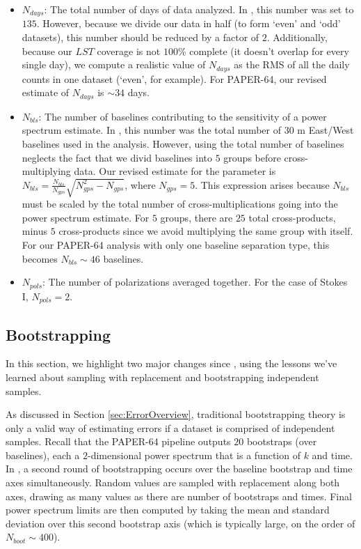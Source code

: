 \documentclass[preprint2,numberedappendix,tighten,twocolappendix]{aastex6}  %
\begin{document}
\begin{itemize}
\item $N_{days}$: The total number of days of data analyzed. In \citet{ali_et_al2015}, this number was set to $135$. However, because we divide our data in half (to form `even' and `odd' datasets), this number should be reduced by a factor of $2$. Additionally, because our $LST$ coverage is not $100\%$ complete (it doesn't overlap for every single day), we compute a realistic value of $N_{days}$ as the RMS of all the daily counts in one dataset (`even', for example). For PAPER-64, our revised estimate of $N_{days}$ is $\sim34$ days.
\item $N_{bls}$: The number of baselines contributing to the sensitivity of a power spectrum estimate. In \citet{ali_et_al2015}, this number was the total number of $30$ m East/West baselines used in the analysis. However, using the total number of baselines neglects the fact that we divid baselines into $5$ groups before cross-multiplying data. Our revised estimate for the parameter is $N_{bls} = \frac{N_{bls}}{N_{gps}}\sqrt{N_{gps}^{2}-N_{gps}}$, where $N_{gps} = 5$. This expression arises because $N_{bls}$ must be scaled by the total number of cross-multiplications going into the power spectrum estimate. For $5$ groups, there are $25$ total cross-products, minus $5$ cross-products since we avoid multiplying the same group with itself. For our PAPER-64 analysis with only one baseline separation type, this becomes $N_{bls} \sim 46$ baselines. 
\item $N_{pols}$: The number of polarizations averaged together. For the case of Stokes I, $N_{pols}=2$.
\end{itemize}

\subsection{Bootstrapping}
\label{sec:Boot}

In this section, we highlight two major changes since \citet{ali_et_al2015}, using the lessons we've learned about sampling with replacement and bootstrapping independent samples.

As discussed in Section \ref{sec:ErrorOverview}, traditional bootstrapping theory is only a valid way of estimating errors if a dataset is comprised of independent samples. Recall that the PAPER-64 pipeline outputs $20$ bootstraps (over baselines), each a $2$-dimensional power spectrum that is a function of $k$ and time. In \citet{ali_et_al2015}, a second round of bootstrapping occurs over the baseline bootstrap and time axes simultaneously. Random values are sampled with replacement along both axes, drawing as many values as there are number of bootstraps and times. Final power spectrum limits are then computed by taking the mean and standard deviation over this second bootstrap axis (which is typically large, on the order of $N_{boot} \sim 400$). 
\end{document}
